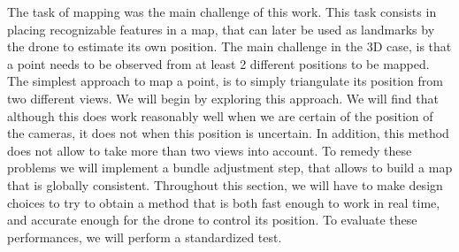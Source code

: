 
The task of mapping was the main challenge of this work. This task consists in placing recognizable features in a map, that can later be used as landmarks by the drone to estimate its own position. The main challenge in the 3D case, is that a point needs to be observed from at least 2 different positions to be mapped. The simplest approach to map a point, is to simply triangulate its position from two different views. We will begin by exploring this approach. We will find that although this does work reasonably well when we are certain of the position of the cameras, it does not when this position is uncertain. In addition, this method does not allow to take more than two views into account. To remedy these problems we will implement a bundle adjustment step, that allows to build a map that is globally consistent. Throughout this section, we will have to make design choices to try to obtain a method that is both fast enough to work in real time, and accurate enough for the drone to control its position. To evaluate these performances, we will perform a standardized test.

